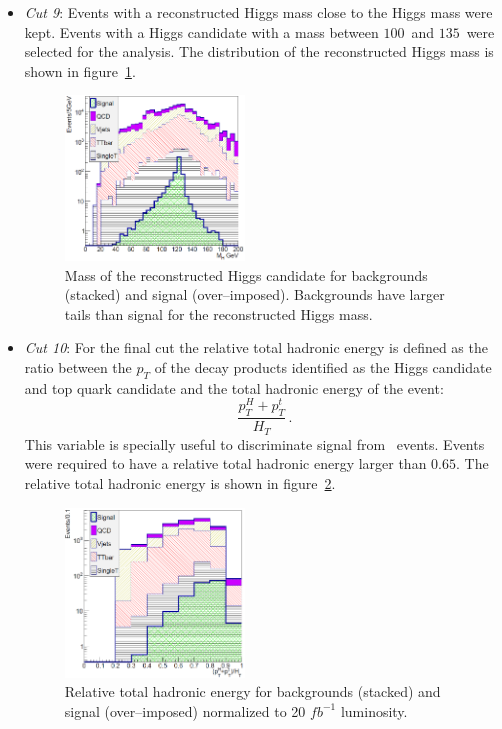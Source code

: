 \begin{itemize}
\item \textit{Cut 9}: Events with a reconstructed Higgs mass close to the Higgs mass were kept. Events with a Higgs candidate with a mass between $100$~\GeVcc and $135$~\GeVcc were selected for the analysis. The distribution of the reconstructed Higgs mass is shown in figure~\ref{fig:Var4}.

\begin{figure}[!Hhtbp]
  \begin{center}
    \includegraphics[width=0.45\textwidth]{figs/Pheno/MH.png}
    \caption{Mass of the reconstructed Higgs candidate for backgrounds (stacked) and signal (over--imposed). Backgrounds have larger tails than signal for the reconstructed Higgs mass.}
    \label{fig:Var4}
  \end{center}
\end{figure}

\item \textit{Cut 10}: For the final cut the relative total hadronic energy is defined as the ratio between the $p_{T}$ of the decay products identified as the Higgs candidate and top quark candidate and the total hadronic energy of the event: $$\frac{p_{T}^{H}+p_{T}^{t}}{H_{T}}\,.$$ This variable is specially useful to discriminate signal from \ttbar~events. Events were required to have a relative total hadronic energy larger than $0.65$. The relative total hadronic energy is shown in figure~\ref{fig:Var5}.

\begin{figure}[!Hhtbp]
  \begin{center}
    \includegraphics[width=0.45\textwidth]{figs/Pheno/RelHT.png}
    \caption{Relative total hadronic energy for backgrounds (stacked) and signal (over--imposed) normalized to 20 $fb^{-1}$ luminosity.}
    \label{fig:Var5}
  \end{center}
\end{figure}

\end{itemize}

